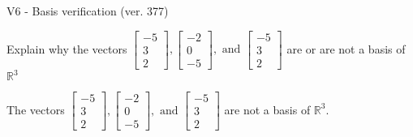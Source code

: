 \begin{exercise}
  \begin{exerciseTitle}V6 - Basis verification (ver. 377)\end{exerciseTitle}
  \begin{exerciseStatement}
    Explain why the vectors \(\left[\begin{array}{r}
-5 \\
3 \\
2
\end{array}\right] , \left[\begin{array}{r}
-2 \\
0 \\
-5
\end{array}\right] , \text{ and } \left[\begin{array}{r}
-5 \\
3 \\
2
\end{array}\right]\) are or are not a basis of \(\mathbb{R}^3\)	


  \end{exerciseStatement}
  \begin{exerciseAnswer}
   The vectors \(\left[\begin{array}{r}
-5 \\
3 \\
2
\end{array}\right] , \left[\begin{array}{r}
-2 \\
0 \\
-5
\end{array}\right] , \text{ and } \left[\begin{array}{r}
-5 \\
3 \\
2
\end{array}\right]\) 
  	 are not  a basis of \(\mathbb{R}^3\).
  


  \end{exerciseAnswer}
\end{exercise}